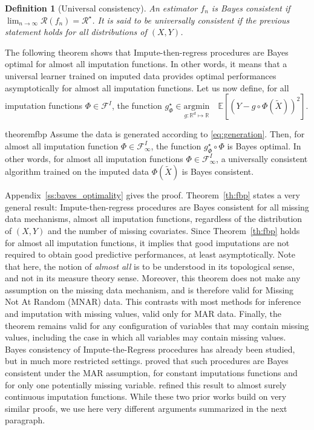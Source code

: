 \documentclass{article}
\newcommand{\RR}{\mathbb{R}}
\newcommand{\E}{\mathbb{E}}
\newcommand{\Fcal}{\mathcal{F}}
\newcommand{\Rcal}{\mathcal{R}}
\newcommand{\br}[1]{\left(#1\right)}
\newcommand{\sqb}[1]{\left[#1\right]}
\theoremstyle{plain}
\newtheorem{definition}{Definition}
\begin{document}
\begin{definition}[Universal consistency]
    An estimator $f_n$ is \emph{Bayes consistent} if $\lim_{n \to \infty}\Rcal(f_n) =  \Rcal^{\star}$. It is said to be \emph{universally consistent} if the previous statement holds for all distributions of $(X,Y)$.
\end{definition}

The following theorem shows that Impute-then-regress procedures are Bayes optimal for almost all imputation functions. In other words, it means that a universal learner trained on imputed data provides optimal performances asymptotically for almost all imputation functions. Let us now define, for all imputation functions $\Phi \in \Fcal^I$, the function $g^\star_{\Phi} \in \underset{g: \RR^d \mapsto \RR}{\text{argmin}} \quad \E\sqb{\br{Y-g \circ \Phi(\widetilde X)}^2}$.

\begin{restatable}{theorem}{fbp}
\label{th:fbp}
    Assume the data is generated according to \eqref{eq:generation}.
    Then, for almost all imputation function $\Phi \in \Fcal^I_{\infty}$, the function $g^\star_{\Phi} \circ \Phi$ is Bayes optimal.
    In other words, for almost all imputation functions $\Phi\in \Fcal^I_{\infty}$, a universally consistent algorithm trained on the imputed data $\Phi(\widetilde X)$ is Bayes consistent.
    
\end{restatable}

Appendix~\ref{ss:bayes_optimality} gives the proof. Theorem~\ref{th:fbp} states a very general result: Impute-then-regress procedures are Bayes consistent for all missing data mechanisms, almost all imputation functions, regardless of the distribution of $(X,Y)$ and the number of missing covariates. Since Theorem~\ref{th:fbp} holds for almost all imputation functions, it implies that good imputations are not required to obtain good predictive performances, at least asymptotically. Note that here, the notion of \emph{almost all} is to be understood in its topological sense, and not in its measure theory sense. Moreover, this theorem does not make any assumption on the missing data mechanism, and is therefore valid for Missing Not At Random (MNAR) data. This contrasts with most methods for inference and imputation with missing values, valid only for MAR data. Finally, the theorem remains valid for any configuration of variables that may contain missing values, including the case in which all variables may contain missing values. 
Bayes consistency of Impute-the-Regress procedures has already been
studied, but in much more restricted settings.
\citet{josse2019consistency} proved that such procedures are Bayes consistent under the MAR assumption, for constant imputations functions and for only one potentially missing variable. 
\citet{Bertsimas2021Prediction} refined this result to almost surely continuous imputation functions. While these two prior works build on very similar proofs, we use here very different arguments summarized in the next paragraph.
\end{document}
